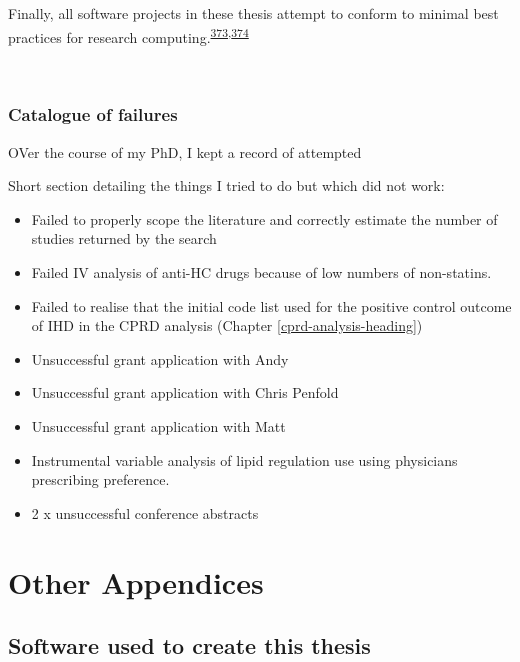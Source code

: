 \documentclass[a4paper, twoside]{templates/ociamthesis}
\begin{document}
Finally, all software projects in these thesis attempt to conform to minimal best practices for research computing.\textsuperscript{\protect\hyperlink{ref-wilson2014}{373},\protect\hyperlink{ref-wilson2017}{374}}

~

\hypertarget{appendix-catalogue-failures}{%
\subsection{Catalogue of failures}\label{appendix-catalogue-failures}}

OVer the course of my PhD, I kept a record of attempted

Short section detailing the things I tried to do but which did not work:

\begin{itemize}
\item
  Failed to properly scope the literature and correctly estimate the number of studies returned by the search
\item
  Failed IV analysis of anti-HC drugs because of low numbers of non-statins.
\item
  Failed to realise that the initial code list used for the positive control outcome of IHD in the CPRD analysis (Chapter \ref{cprd-analysis-heading})
\item
  Unsuccessful grant application with Andy
\item
  Unsuccessful grant application with Chris Penfold
\item
  Unsuccessful grant application with Matt
\item
  Instrumental variable analysis of lipid regulation use using physicians prescribing preference.
\item
  2 x unsuccessful conference abstracts
\end{itemize}

\hypertarget{other-appendix-heading}{%
\chapter{Other Appendices}\label{other-appendix-heading}}

\minitoc 

\newpage

\hypertarget{software-used-to-create-this-thesis}{%
\section{Software used to create this thesis}\label{software-used-to-create-this-thesis}}
\end{document}
